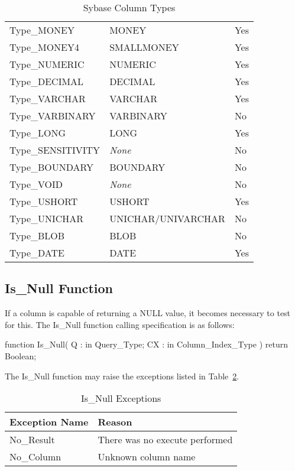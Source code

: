 \documentclass[english,letterpaper]{book}
\begin{document}
\begin{table}
\begin{center}
\begin{tabular}{lll}
         Type\_MONEY                &  MONEY                &  Yes\\
         Type\_MONEY4               &  SMALLMONEY           &  Yes\\
         Type\_NUMERIC              &  NUMERIC              &  Yes\\
         Type\_DECIMAL              &  DECIMAL              &  Yes\\
         Type\_VARCHAR              &  VARCHAR              &  Yes\\
         Type\_VARBINARY            &  VARBINARY            &  No\\
         Type\_LONG                 &  LONG                 &  Yes\\
         Type\_SENSITIVITY          &  \emph{None}          &  No\\
         Type\_BOUNDARY             &  BOUNDARY             &  No\\
         Type\_VOID                 &  \emph{None}          &  No\\
         Type\_USHORT               &  USHORT               &  Yes\\
         Type\_UNICHAR              &  UNICHAR/UNIVARCHAR   &  No\\
         Type\_BLOB                 &  BLOB                 &  No\\
         Type\_DATE                 &  DATE                 &  Yes\\
      \end{tabular}
   \end{center}
   \caption{Sybase Column Types}\label{t:sycoltyp}
\end{table}


\subsection{Is\_Null Function}

If a column is capable of returning a NULL value, it
becomes necessary to test for this. The Is\_Null function calling
specification is as follows:

\begin{Code}
function Is_Null(
   Q :  in Query_Type;
   CX : in Column_Index_Type
) return Boolean;
\end{Code}

The Is\_Null function may raise the exceptions listed in Table~\ref{t:isnullx}.

\begin{table}
   \begin{center}
      \begin{tabular}{ll}
         Exception Name    &  Reason\\
         \hline 
         No\_Result        &  There was no execute performed\\
         No\_Column        &  Unknown column name\\
      \end{tabular}
   \end{center}
   \caption{Is\_Null Exceptions}\label{t:isnullx}
\end{table}
\end{document}
